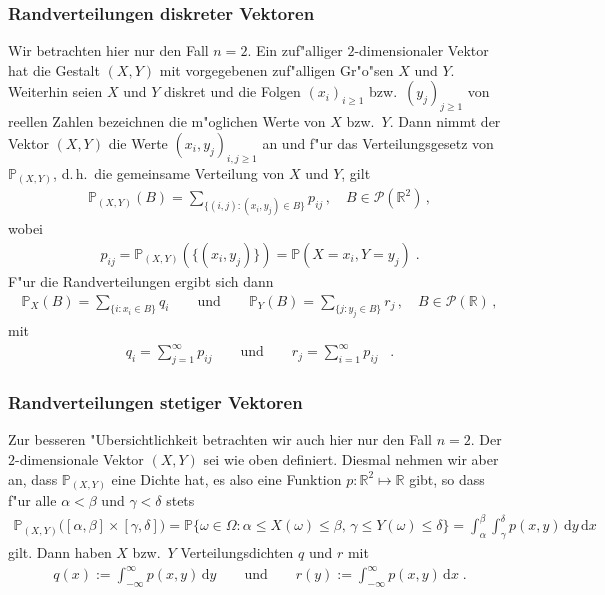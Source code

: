\documentclass[ngerman,draft,parskip=half,twoside]{scrartcl}
\newcommand*{\R}{\mathbb{R}}      %
\newcommand*{\PotM}{\mathcal{P}}    %
\newcommand*{\WKM}{\mathbb{P}}      %
\begin{document}
\subsubsection{Randverteilungen diskreter Vektoren}
\label{disk}
Wir betrachten hier nur den Fall $n=2$. Ein zuf"alliger $2$-dimensionaler Vektor hat die Gestalt
$(X,Y)$ mit vorgegebenen zuf"alligen Gr"o"sen $X$ und $Y$. Weiterhin seien $X$ und $Y$ diskret und die
Folgen
$(x_i)_{i\ge 1}$ bzw.~$(y_j)_{j\ge 1}$ von reellen Zahlen bezeichnen  die m"oglichen Werte von $X$ bzw.~$Y$.
Dann nimmt der Vektor $(X,Y)$ die Werte $(x_i,y_j)_{i,j\ge 1}$ an und f"ur das Verteilungsgesetz
von $\WKM_{(X,Y)}$, d.\,h.~die gemeinsame Verteilung von $X$ und $Y$, gilt
\begin{gather*}
  \WKM_{(X,Y)}(B)=\sum_{\{(i,j)\colon (x_i,y_j)\in B\}} p_{ij}\,,\quad B\in\PotM(\R^2)\,,
\end{gather*}
wobei
\begin{gather*}
  p_{ij}= \WKM_{(X,Y)}(\{(x_i,y_j)\})=\WKM(X=x_i,Y=y_j)\;.
\end{gather*}
F"ur die Randverteilungen ergibt sich dann
\begin{gather*}
  \WKM_X(B)=\sum_{\{i\colon x_i\in B\}} q_i \qquad\mbox{und}\qquad
     \WKM_Y(B)=\sum_{\{j\colon y_j\in B\}} r_j\,,\quad B\in\PotM(\R)\,,
\end{gather*}
mit
\begin{gather*}
  q_i=\sum_{j=1}^\infty p_{ij}\qquad\mbox{und}\qquad r_j=\sum_{i=1}^\infty p_{ij}\;\;\;.
\end{gather*}
\subsubsection{Randverteilungen stetiger Vektoren}
\label{stet}
Zur besseren "Ubersichtlichkeit betrachten wir auch hier nur den Fall $n=2$. Der
$2$-dimensionale Vektor $(X,Y)$ sei wie oben definiert. Diesmal nehmen wir aber an, dass
$\WKM_{(X,Y)}$ eine Dichte hat, es also eine Funktion $p \colon\R^2\mapsto\R$ gibt, so
dass f"ur alle $\alpha<\beta$ und $\gamma<\delta$ stets
\begin{gather*}
  \WKM_{(X,Y)}\big([\alpha,\beta]\times[\gamma,\delta]\big)
     =\WKM\{\omega\in \Omega \colon \alpha\le X(\omega)\le\beta,\,\gamma\le Y(\omega)\le\delta\}
     =\int_\alpha^\beta\int_\gamma^\delta p(x,y)\,\mathrm d y \,\mathrm d x
\end{gather*}
gilt. Dann haben $X$ bzw.~$Y$ Verteilungsdichten $q$ und $r$ mit
\begin{gather*}
  q(x):=\int_{-\infty}^\infty p(x,y)\,\mathrm d y\qquad\mbox{und}\qquad
     r(y):=\int_{-\infty}^\infty p(x,y)\,\mathrm d x\;.
\end{gather*}
\end{document}

